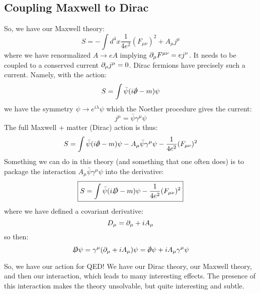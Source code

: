 \subsection{Coupling Maxwell to Dirac}
So, we have our Maxwell theory:
\begin{equation}
    S = -\int d^4x \frac{1}{4e^2}(F_{\mu\nu})^2 + A_\mu j^\mu
\end{equation}
where we have renormalized $A \to eA$ implying $\partial_\mu F^{\mu\nu} = ej^\nu$. It needs to be coupled to a conserved current $\partial_\mu j^\mu = 0$. Dirac fermions have precisely such a current. Namely, with the action:
\begin{equation}
    S = \int \bar{\psi}(i\slashed{\p} - m)\psi
\end{equation}
we have the symmetry $\psi \to e^{i\lambda}\psi$ which the Noether procedure gives the current:
\begin{equation}
    j^\mu = \bar{\psi}\gamma^\mu \psi
\end{equation}
The full Maxwell + matter (Dirac) action is thus:
\begin{equation}
    S = \int \bar{\psi}(i\slashed{\p} - m)\psi - A_\mu \bar{\psi}\gamma^\mu \psi - \frac{1}{4e^2}(F_{\mu\nu})^2
\end{equation}
Something we can do in this theory (and something that one often does) is to package the interaction $A_\mu \bar{\psi}\gamma^\mu \psi$ into the derivative:
\begin{equation}
    \boxed{S = \int \bar{\psi}(i\slashed{D} - m)\psi- \frac{1}{4e^2}(F_{\mu\nu})^2}
\end{equation}
where we have defined a covariant derivative:
\begin{equation}
    D_\mu = \partial_\mu + iA_\mu
\end{equation}
so then:
\begin{equation}
    \slashed{D} \psi = \gamma^\mu(\p_\mu + iA_\mu)\psi = \slashed{\p}\psi + iA_\mu \gamma^\mu \psi
\end{equation}

So, we have our action for QED! We have our Dirac theory, our Maxwell theory, and then our interaction, which leads to many interesting effects. The presence of this interaction makes the theory unsolvable, but quite interesting and subtle.

